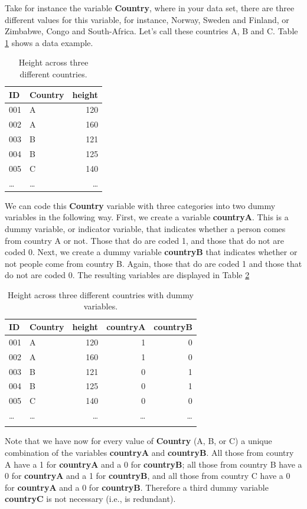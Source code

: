 \documentclass[]{report}\usepackage[]{graphicx}\usepackage[]{color}
\begin{document}
Take for instance the variable \textbf{Country}, where in your data set, there are three different values for this variable, for instance, Norway, Sweden and Finland, or Zimbabwe, Congo and South-Africa. Let's call these countries A, B and C. Table \ref{tab:countryheight} shows a data example.
 
 \begin{table}
 \caption{Height across three different countries.}
 \begin{tabular}{llr}
 ID & Country &  height\\ \hline
  001 &A & 120\\
  002 &A & 160\\
  003 &B & 121\\
  004 &B & 125\\
  005 &C & 140\\
  \dots & \dots & \dots\\
 \end{tabular} 
 \label{tab:countryheight}
 \end{table}


We can code this \textbf{Country} variable with three categories into two dummy variables in the following way. First, we create a variable \textbf{countryA}. This is a dummy variable, or indicator variable, that indicates whether a person comes from country A or not. Those that do are coded 1, and those that do not are coded 0. Next, we create a dummy variable \textbf{countryB} that indicates whether or not people come from country B. Again, those that do are coded 1 and those that do not are coded 0. The resulting variables are displayed in Table \ref{tab:dummy}
 
 \begin{table}
 \caption{Height across three different countries with dummy variables.}
 \begin{tabular}{llrrr}
 ID & Country &  height & countryA & countryB \\ \hline
  001 &A & 120 & 1 & 0\\
  002 &A & 160 & 1 & 0\\
  003 &B & 121 & 0 & 1\\
  004 &B & 125 & 0 & 1\\
  005 &C & 140 & 0 & 0\\
  \dots & \dots & \dots& \dots & \dots\\
  \label{tab:dummy}
 \end{tabular}
 \end{table}

Note that we have now for every value of \textbf{Country} (A, B, or C) a unique combination of the variables \textbf{countryA} and \textbf{countryB}. All those from country A have a 1 for \textbf{countryA} and a 0 for \textbf{countryB}; all those from country B have a 0 for \textbf{countryA} and a 1 for \textbf{countryB}, and all those from country C have a 0 for \textbf{countryA} and a 0 for \textbf{countryB}. Therefore a third dummy variable \textbf{countryC} is not necessary (i.e., is redundant). 
\end{document}
